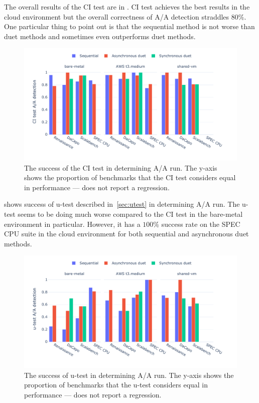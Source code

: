 The overall results of the CI test are in .
CI test achieves the best results in the cloud environment but the overall correctness of A/A detection straddles $80\%$.
One particular thing to point out is that the sequential method is not worse than duet methods and sometimes even outperforms duet methods.

\begin{figure}
	\centering
	\includegraphics[width=1\linewidth]{./figures/citest_aa_match.pdf}
	\caption{
		The success of the CI test in determining A/A run.
		The \mbox{y-axis} shows the proportion of benchmarks that the CI test considers equal in performance --- does not report a regression.
	}
	\label{fig:citest_aa}
\end{figure}

 shows success of \mbox{u-test} described in~\cref{sec:utest} in determining A/A run.
The \mbox{u-test} seems to be doing much worse compared to the CI test in the \mbox{bare-metal} environment in particular.
However, it has a $100\%$ success rate on the SPEC CPU suite in the cloud environment for both sequential and asynchronous duet methods.

\begin{figure}
	\centering
	\includegraphics[width=1\linewidth]{./figures/utest_aa_match.pdf}
	\caption{
		The success of \mbox{u-test} in determining A/A run.
		The \mbox{y-axis} shows the proportion of benchmarks that the \mbox{u-test} considers equal in performance --- does not report a regression.
	}
	\label{fig:utest_aa}
\end{figure}


